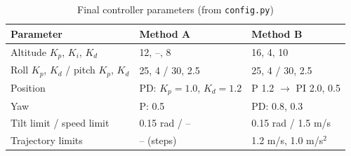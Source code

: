\begin{table}[h]
\centering
\caption{Final controller parameters (from \texttt{config.py})}
\label{tab:gains}
\begin{tabular}{|P{5.6cm}|P{3.4cm}|P{3.8cm}|}
\hline
\textbf{Parameter} & \textbf{Method A} & \textbf{Method B} \\ \hline
Altitude $K_p$, $K_i$, $K_d$ & 12, --, 8 & 16, 4, 10 \\ \hline
Roll $K_p$, $K_d$ / pitch $K_p$, $K_d$ & 25, 4 / 30, 2.5 & 25, 4 / 30, 2.5 \\ \hline
Position & PD: $K_p = 1.0$, $K_d = 1.2$ & P 1.2 $\rightarrow$ PI 2.0, 0.5 \\ \hline
Yaw & P: 0.5 & PD: 0.8, 0.3 \\ \hline
Tilt limit / speed limit & 0.15 rad / -- & 0.15 rad / 1.5 m/s \\ \hline
Trajectory limits & -- (steps) & 1.2 m/s, 1.0 m/s$^2$ \\ \hline
\end{tabular}
\end{table}
